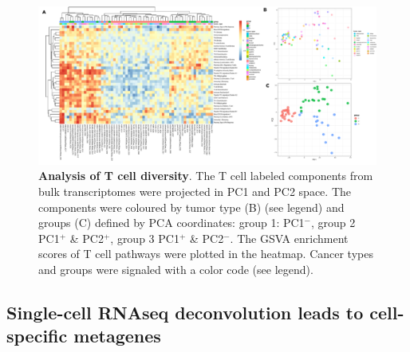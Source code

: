 \documentclass[12pt,]{book}
\theoremstyle{definition}
\theoremstyle{definition}
\theoremstyle{definition}
\theoremstyle{remark}
\begin{document}
\begin{figure}

{\centering \includegraphics[width=7.5in,angle=90]{figures-ext/TcellDiv} 

}

\caption[Analysis of T cell diversity]{\textbf{Analysis of T cell diversity}. The T cell
labeled components from bulk transcriptomes were projected in PC1 and
PC2 space. The components were coloured by tumor type (B) (see legend)
and groups (C) defined by PCA coordinates: group 1: PC1\(^-\), group 2
PC1\(^+\) \& PC2\(^+\), group 3 PC1\(^+\) \& PC2\(^-\). The GSVA
enrichment scores of T cell pathways were plotted in the heatmap. Cancer
types and groups were signaled with a color code (see legend).}\label{fig:tcelldiv}
\end{figure}









\hypertarget{single-cell-rnaseq-deconvolution-leads-to-cell-specific-metagenes}{%
\subsection{Single-cell RNAseq deconvolution leads to cell-specific
metagenes}\label{single-cell-rnaseq-deconvolution-leads-to-cell-specific-metagenes}}
\end{document}

